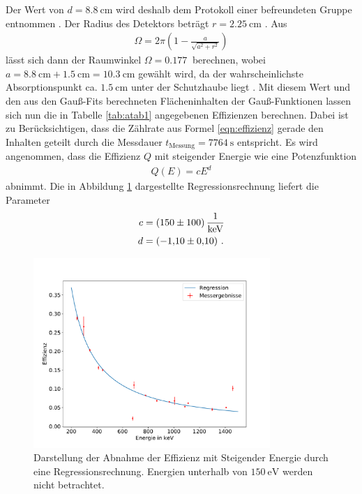 Der Wert von $d=\SI{8.8}{\centi\meter}$ wird deshalb dem Protokoll einer befreundeten Gruppe entnommen \cite{abstand}.
Der Radius des Detektors beträgt $r=\SI{2.25}{\centi\meter}$ \cite{sample}.
Aus
\begin{align}
\Omega=2\pi\left( 1- \frac{a}{\sqrt{a^2+r^2}}\right)
\end{align}
lässt sich dann der Raumwinkel $\Omega=\SI{0.177}{}$ berechnen, wobei $a=\SI{8.8}{\centi\meter}+\SI{1.5}{\centi\meter}=\SI{10.3}{\centi\meter}$ gewählt wird, da der wahrscheinlichste Absorptionspunkt ca. $\SI{1.5}{\centi\meter}$ unter der Schutzhaube liegt \cite{sample}.
Mit diesem Wert und den aus den Gauß-Fits berechneten Flächeninhalten der Gauß-Funktionen lassen sich nun die in Tabelle \ref{tab:atab1} angegebenen Effizienzen berechnen.
Dabei ist zu Berücksichtigen, dass die Zählrate aus Formel \ref{eqn:effizienz} gerade den Inhalten geteilt durch die Messdauer $t_\text{Messung}=\SI{7764}{\second}$ entspricht.
Es wird angenommen, dass die Effizienz $Q$ mit steigender Energie wie eine Potenzfunktion
\begin{align}
Q(E)=c E^{d}
\end{align}
abnimmt.
Die in Abbildung \ref{fig:Effizienz} dargestellte Regressionsrechnung liefert die Parameter
\begin{align*}
c&=\SI{150+-100}{\per\kilo\electronvolt}\\
d&=\SI{-1.10+-0.1}{}\text{ .}
\end{align*}
\begin{figure}
\centering
\includegraphics[width=0.8\textwidth]{python/plots/effizienz.pdf}
\caption{Darstellung der Abnahme der Effizienz mit Steigender Energie durch eine Regressionsrechnung. Energien unterhalb von $\SI{150}{\electronvolt}$ werden nicht betrachtet.}
\label{fig:Effizienz}
\end{figure}

